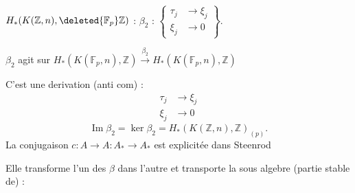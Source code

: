 $H_*(K(\mathbb Z,n),\deleted{\mathbb F_p}\mathbb Z)$ : $\beta_2$ :
$\left\{\begin{aligned}\tau_j&\longrightarrow\xi_j\\ \xi_j&\longrightarrow0\end{aligned}\right\}$.

$\beta_2$ agit sur $H_*(K(\mathbb F_p,n),\mathbb Z)\xrightarrow{\beta_2}H_*(K(\mathbb F_p,n),\mathbb Z)$

C'est une derivation (anti com) :
\[
\begin{aligned}\tau_j&\longrightarrow\xi_j\\ \xi_j&\longrightarrow0\end{aligned}
\]
\[
\operatorname{Im}\beta_2=\ker\beta_2=H_*(K(\mathbb Z,n),\mathbb Z)_{(p)} .
\]
La conjugaison $c:A\longrightarrow A$\quad $:A_*\longrightarrow A_*$ est explicitée dans Steenrod

Elle transforme l'un des $\beta$ dans l'autre et transporte la sous algebre (partie stable de) :
